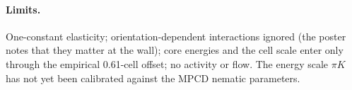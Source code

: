 \paragraph{Limits.} One-constant elasticity; orientation-dependent interactions ignored (the poster notes that they matter at the wall); core
energies and the cell scale enter only through the empirical 0.61-cell offset; no activity or flow. The energy scale $\pi K$ has not yet been
calibrated against the MPCD nematic parameters.
